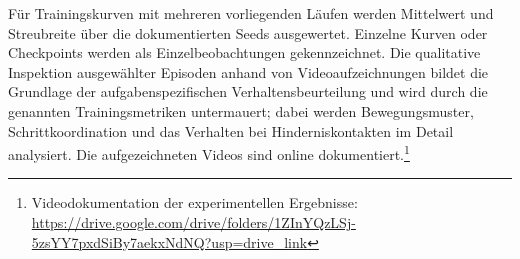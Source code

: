 Für Trainingskurven mit mehreren vorliegenden Läufen werden Mittelwert und Streubreite über die dokumentierten Seeds ausgewertet. Einzelne Kurven oder Checkpoints werden als Einzelbeobachtungen gekennzeichnet. Die qualitative Inspektion ausgewählter Episoden anhand von Videoaufzeichnungen bildet die Grundlage der aufgabenspezifischen Verhaltensbeurteilung und wird durch die genannten Trainingsmetriken untermauert; dabei werden Bewegungsmuster, Schrittkoordination und das Verhalten bei Hinderniskontakten im Detail analysiert. Die aufgezeichneten Videos sind online dokumentiert.\footnote{Videodokumentation der experimentellen Ergebnisse: \url{https://drive.google.com/drive/folders/1ZInYQzLSj-5zsYY7pxdSiBy7aekxNdNQ?usp=drive_link}}